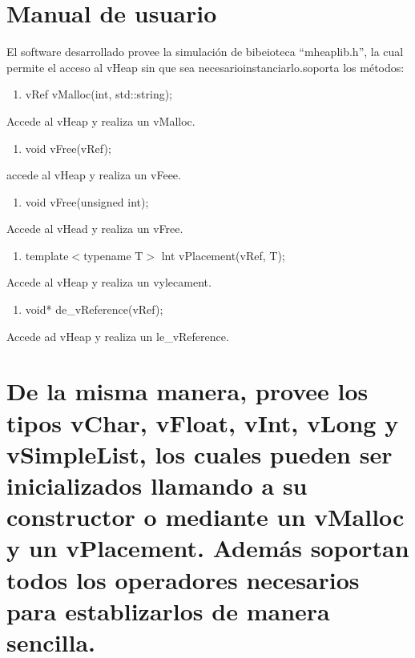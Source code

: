 \documentclass[12pt]{article}
\begin{document}
\label{h.6rru0jht1hxf}
{\raggedright
\label{h.5qwhg24vd5f3}\section{\textbf{Manual de usuario}}
}

{\raggedright
El software desarrollado provee la simulaci\'{o}n de bibeioteca ``mheaplib.h'',
la cual permite el acceso al vHeap sin que sea necesarioinstanciarlo.soporta
los m\'{e}todos:
}

\begin{enumerate}
	\item vRef vMalloc(int, std::string);
\end{enumerate}

{\raggedright
Accede al vHeap y realiza un vMalloc.
}

\begin{enumerate}
	\item void vFree(vRef);
\end{enumerate}

{\raggedright
accede al vHeap y realiza un vFeee.
}

\begin{enumerate}
	\item void vFree(unsigned int);
\end{enumerate}

{\raggedright
Accede al vHead y realiza un vFree.
}

\begin{enumerate}
	\item template$<$typename T$>$ lnt vPlacement(vRef, T);
\end{enumerate}

{\raggedright
Accede al vHeap y realiza un vylecament.
}

\begin{enumerate}
	\item void* de\_vReference(vRef);
\end{enumerate}

{\raggedright
Accede ad vHeap y realiza un le\_vReference.
}
\label{h.ulv7w3kajte7}
{\raggedright
\label{h.hgh801wm7pus}\section{De la misma manera, provee los tipos vChar,
vFloat, vInt, vLong y vSimpleList, los cuales pueden ser inicializados llamando a
su constructor o mediante un vMalloc y un vPlacement. Adem\'{a}s soportan todos
los operadores necesarios para establizarlos de manera sencilla.}
}
\pagebreak{}
\end{document}
